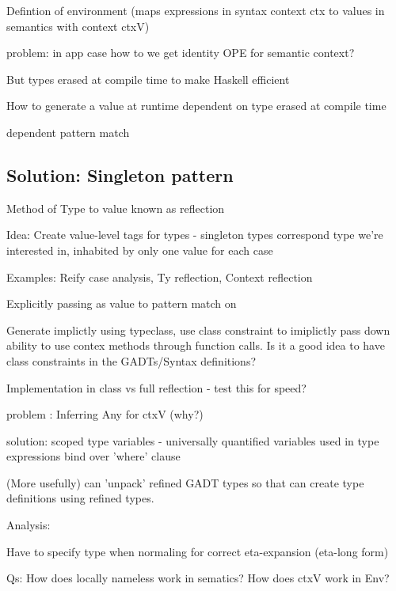 Defintion of environment (maps expressions in syntax context ctx to values in semantics with context ctxV)

problem: in app case how to we get identity OPE for semantic context?

But types erased at compile time to make Haskell efficient

How to generate a value at runtime dependent on type erased at compile time

dependent pattern match \cite{SingletonsGuide}

\subsection{Solution: Singleton pattern}

Method of Type to value known as reflection \cite{SingletonsGuide}

Idea: Create value-level tags for types - singleton types correspond type we're interested in, inhabited by only one value for each case

Examples: Reify case analysis, Ty reflection, Context reflection

Explicitly passing as value to pattern match on

Generate implictly using typeclass, use class constraint to imiplictly pass down ability to use contex methods through function calls.
Is it a good idea to have class constraints in the GADTs/Syntax definitions?

Implementation in class vs full reflection - test this for speed?

problem : Inferring Any for ctxV (why?)

solution: scoped type variables - universally quantified variables used in type expressions bind over 'where' clause

(More usefully) can 'unpack' refined GADT types so that can create type definitions using refined types.

Analysis:

Have to specify type when normaling for correct eta-expansion (eta-long form)

Qs:
How does locally nameless work in sematics?
How does ctxV work in Env?
